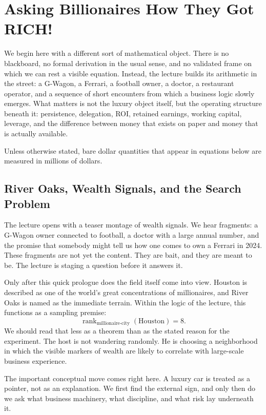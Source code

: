 \chapter{Asking Billionaires How They Got RICH!}

We begin here with a different sort of mathematical object. There is no blackboard, no formal derivation in the usual sense, and no validated frame on which we can rest a visible equation. Instead, the lecture builds its arithmetic in the street: a G-Wagon, a Ferrari, a football owner, a doctor, a restaurant operator, and a sequence of short encounters from which a business logic slowly emerges. What matters is not the luxury object itself, but the operating structure beneath it: persistence, delegation, ROI, retained earnings, working capital, leverage, and the difference between money that exists on paper and money that is actually available.

Unless otherwise stated, bare dollar quantities that appear in equations below are measured in millions of dollars.

\section{River Oaks, Wealth Signals, and the Search Problem}

The lecture opens with a teaser montage of wealth signals. We hear fragments: a G-Wagon owner connected to football, a doctor with a large annual number, and the promise that somebody might tell us how one comes to own a Ferrari in 2024. These fragments are not yet the content. They are bait, and they are meant to be. The lecture is staging a question before it answers it.

Only after this quick prologue does the field itself come into view. Houston is described as one of the world's great concentrations of millionaires, and River Oaks is named as the immediate terrain. Within the logic of the lecture, this functions as a sampling premise:
\begin{equation}
\operatorname{rank}_{\text{millionaire-city}}(\text{Houston}) = 8.
\end{equation}
We should read that less as a theorem than as the stated reason for the experiment. The host is not wandering randomly. He is choosing a neighborhood in which the visible markers of wealth are likely to correlate with large-scale business experience.

The important conceptual move comes right here. A luxury car is treated as a pointer, not as an explanation. We first find the external sign, and only then do we ask what business machinery, what discipline, and what risk lay underneath it.

